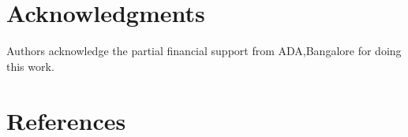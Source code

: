 \documentclass{AIAA}
\begin{document}
\section*{Acknowledgments}
Authors acknowledge the partial financial support from ADA,Bangalore for doing this work.

\section*{References}



\end{document}

